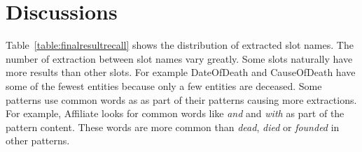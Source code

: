 

\section{Discussions}


Table~\ref{table:finalresultrecall} shows the distribution of extracted slot names.
The number of extraction between slot names vary greatly.
Some slots naturally have more results than other slots.
For example DateOfDeath and CauseOfDeath have some of the fewest entities because only a few entities are deceased.
Some patterns use common words as as part of their patterns causing more extractions.
For example, Affiliate looks for common words like  \textit{and} and  \textit{with} as part of the pattern content.
These words are more common than \textit{dead}, \textit{died} or \textit{founded} in other patterns. 


